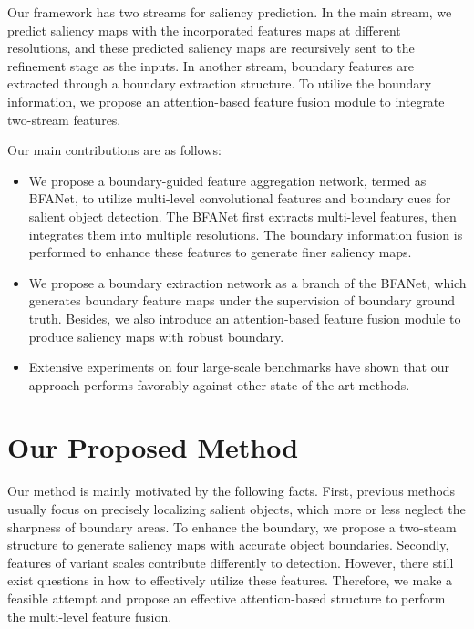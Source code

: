 \documentclass[journal]{IEEEtran}
\begin{document}
Our framework has two streams for saliency prediction.
%
In the main stream, we predict saliency maps with the incorporated features maps at different resolutions, and these predicted saliency maps are recursively sent to the refinement stage as the inputs.
%
In another stream, boundary features are extracted through a boundary extraction structure.
%
To utilize the boundary information, we propose an attention-based feature fusion module to integrate two-stream features.

Our main contributions are as follows:
\begin{itemize}
\item 
We propose a boundary-guided feature aggregation network, termed as BFANet, to utilize multi-level convolutional features and boundary cues for salient object detection.
%
The BFANet first extracts multi-level features, then integrates them into multiple resolutions.
%
The boundary information fusion is performed to enhance these features to generate finer saliency maps.
\item 
We propose a boundary extraction network as a branch of the BFANet, which generates boundary feature maps under the supervision of boundary ground truth.
%
Besides, we also introduce an attention-based feature fusion module to produce saliency maps with robust boundary.
\item 
Extensive experiments on four large-scale benchmarks have shown that our approach performs favorably against other state-of-the-art methods.
\end{itemize}
\section{Our Proposed Method}
\label{sec:previous work}
%
Our method is mainly motivated by the following facts.
%
First, previous methods usually focus on precisely localizing salient objects, which more or less neglect the sharpness of boundary areas.
%
To enhance the boundary, we propose a two-steam structure to generate saliency maps with accurate object boundaries.
%
Secondly, features of variant scales contribute differently to detection.
%
However, there still exist questions in how to effectively utilize these features.
%
Therefore, we make a feasible attempt and propose an effective attention-based structure to perform the multi-level feature fusion.
\end{document}
